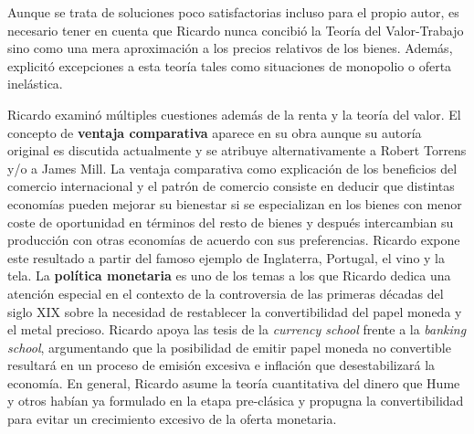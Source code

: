 \documentclass{nuevotema}
\begin{document}
Aunque se trata de soluciones poco satisfactorias incluso para el propio autor, es necesario tener en cuenta que Ricardo nunca concibió la Teoría del Valor-Trabajo sino como una mera aproximación a los precios relativos de los bienes. Además, explicitó excepciones a esta teoría tales como situaciones de monopolio o oferta inelástica.  

Ricardo examinó múltiples cuestiones además de la renta y la teoría del valor. El concepto de \textbf{ventaja comparativa }aparece en su obra aunque su autoría original es discutida actualmente y se atribuye alternativamente a Robert Torrens y/o a James Mill. La ventaja comparativa como explicación de los beneficios del comercio internacional y el patrón de comercio consiste en deducir que distintas economías pueden mejorar su bienestar si se especializan en los bienes con menor coste de oportunidad en términos del resto de bienes y después intercambian su producción con otras economías de acuerdo con sus preferencias. Ricardo expone este resultado a partir del famoso ejemplo de Inglaterra, Portugal, el vino y la tela. La \textbf{política monetaria} es uno de los temas a los que Ricardo dedica una atención especial en el contexto de la controversia de las primeras décadas del siglo XIX sobre la necesidad de restablecer la convertibilidad del papel moneda y el metal precioso. Ricardo apoya las tesis de la \textit{currency school} frente a la \textit{banking school}, argumentando que la posibilidad de emitir papel moneda no convertible resultará en un proceso de emisión excesiva e inflación que desestabilizará la economía. En general, Ricardo asume la teoría cuantitativa del dinero que Hume y otros habían ya formulado en la etapa pre-clásica y propugna la convertibilidad para evitar un crecimiento excesivo de la oferta monetaria.
\end{document}
